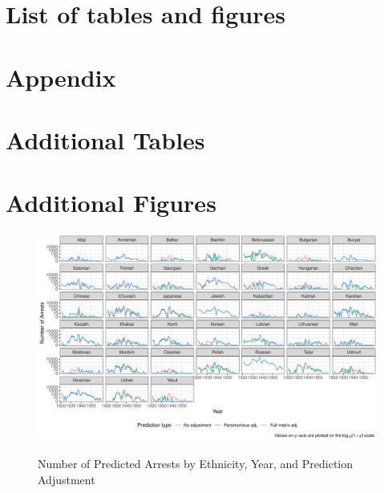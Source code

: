 \newpage
\section*{List of tables and figures}
\listoftables
\listoffigures



\newpage
\section*{Appendix}

\section*{Additional Tables}
{

\newpage


\newpage


\newpage


\newpage

%


\newpage


\newpage
}
\section*{Additional Figures}
\begin{figure}[!h]
\centering
\caption{Number of Predicted Arrests by Ethnicity, Year, and Prediction Adjustment}
\includegraphics[width=1.2\textwidth]{plots/arrests/prediction_type_by_year.pdf}
\label{fig:prediction_type_by_year}
\end{figure}

